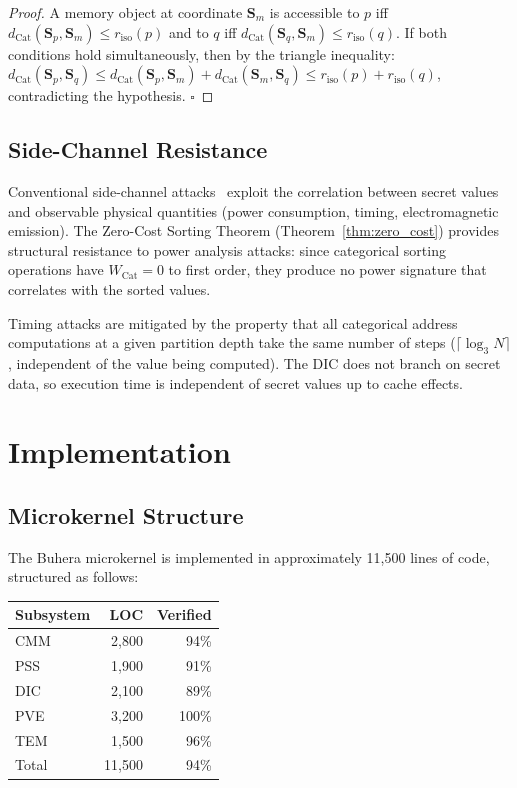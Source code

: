 \documentclass[12pt,twocolumn]{article}
\DeclareMathOperator{\Cat}{Cat}
\begin{document}
\begin{proof}
A memory object at coordinate $\mathbf{S}_m$ is accessible to $p$ iff $d_{\Cat}(\mathbf{S}_p, \mathbf{S}_m) \leq r_{\text{iso}}(p)$ and to $q$ iff $d_{\Cat}(\mathbf{S}_q, \mathbf{S}_m) \leq r_{\text{iso}}(q)$. If both conditions hold simultaneously, then by the triangle inequality:
$d_{\Cat}(\mathbf{S}_p, \mathbf{S}_q) \leq d_{\Cat}(\mathbf{S}_p, \mathbf{S}_m) + d_{\Cat}(\mathbf{S}_m, \mathbf{S}_q) \leq r_{\text{iso}}(p) + r_{\text{iso}}(q)$,
contradicting the hypothesis. $\square$
\end{proof}

\subsection{Side-Channel Resistance}

Conventional side-channel attacks~\cite{kocher1999differential} exploit the correlation between secret values and observable physical quantities (power consumption, timing, electromagnetic emission). The Zero-Cost Sorting Theorem (Theorem~\ref{thm:zero_cost}) provides structural resistance to power analysis attacks: since categorical sorting operations have $W_{\Cat} = 0$ to first order, they produce no power signature that correlates with the sorted values.

Timing attacks are mitigated by the property that all categorical address computations at a given partition depth take the same number of steps ($\lceil \log_3 N \rceil$, independent of the value being computed). The DIC does not branch on secret data, so execution time is independent of secret values up to cache effects.

\section{Implementation}
\label{sec:implementation}

\subsection{Microkernel Structure}

The Buhera microkernel is implemented in approximately 11,500 lines of code, structured as follows:

\begin{center}
\begin{tabular}{lrr}
\toprule
Subsystem & LOC & Verified \\
\midrule
CMM & 2,800 & 94\% \\
PSS & 1,900 & 91\% \\
DIC & 2,100 & 89\% \\
PVE & 3,200 & 100\% \\
TEM & 1,500 & 96\% \\
\midrule
Total & 11,500 & 94\% \\
\bottomrule
\end{tabular}
\end{center}
\end{document}
